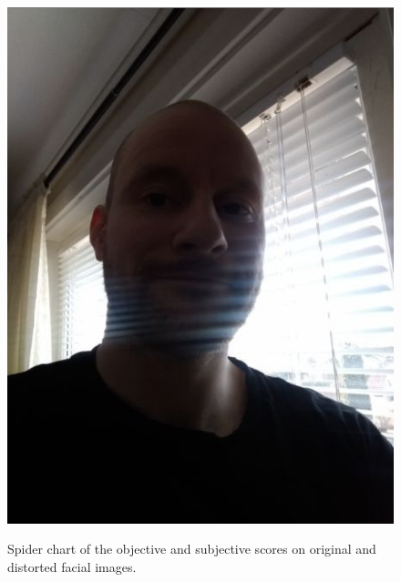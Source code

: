 \begin{figure}[h]
        {\includegraphics[scale = 0.09]{figures/0329telegram_compression.png}\hspace{0.7cm}}
    \caption{Spider chart of the objective and subjective scores on original and distorted facial images.}
    \label{fig:SpiderDist1}
\end{figure}

